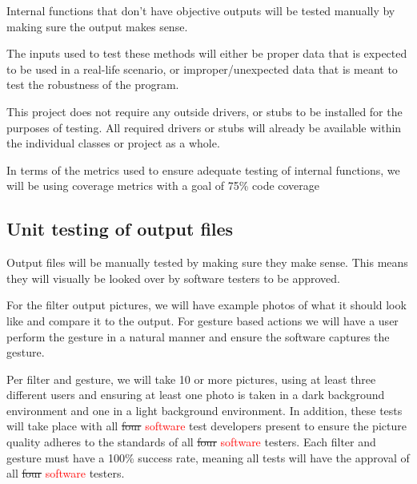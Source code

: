 \documentclass[12pt, titlepage]{article}
\begin{document}
Internal functions that don't have objective outputs will be tested manually by making sure the output makes sense.

The inputs used to test these methods will either be proper data that is expected to be used in a real-life scenario, or improper/unexpected data that is meant to test the robustness of the program.

This project does not require any outside drivers, or stubs to be installed for the purposes of testing. All required drivers or stubs will already be available within the individual classes or project as a whole.

In terms of the metrics used to ensure adequate testing of internal functions, we will be using coverage metrics with a goal of 75\% code coverage
		
\subsection{Unit testing of output files}
\hspace{\parindent}Output files will be manually tested by making sure they make sense. This means they will visually be looked over by software testers to be approved.

For the filter output pictures, we will have example photos of what it should look like and compare it to the output. For gesture based actions we will have a user perform the gesture in a natural manner and ensure the software captures the gesture.

Per filter and gesture, we will take 10 or more pictures, using at least three different users and ensuring at least one photo is taken in a dark background environment and one in a light background environment. In addition, these tests will take place with all \sout{four} \textcolor{red}{software} test developers present to ensure the picture quality adheres to the standards of all \sout{four} \textcolor{red}{software} testers. Each filter and gesture must have a 100\% success rate, meaning all tests will have the approval of all \sout{four} \textcolor{red}{software} testers.




\end{document}

